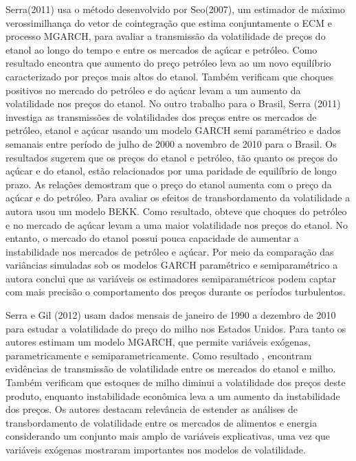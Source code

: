 \documentclass[a4paper,12pt] {article}
\begin{document}
	
	Serra(2011)  usa o método desenvolvido por Seo(2007), um estimador de máximo verossimilhança do vetor de cointegração que estima conjuntamente o ECM e 
	processo MGARCH, para avaliar a transmissão da volatilidade de preços do etanol ao longo do tempo e entre os mercados de açúcar e petróleo. Como resultado encontra que aumento do preço petróleo leva ao  um novo equilíbrio caracterizado por preços mais altos do etanol.  Também verificam que choques positivos no mercado do petróleo e do açúcar levam a um aumento da volatilidade nos preços do etanol.  No outro trabalho para o Brasil, Serra (2011) investiga as transmissões de volatilidades dos preços entre os mercados de petróleo, etanol e açúcar  usando um modelo GARCH semi paramétrico e dados semanais entre período de julho de 2000 a novembro de 2010 para o Brasil. Os resultados sugerem que os preços do etanol e petróleo, tão quanto os preços do açúcar e do etanol, estão relacionados por uma paridade de equilíbrio de longo prazo. As relações demostram que o preço do etanol aumenta com o preço da açúcar e do petróleo. Para avaliar os efeitos de transbordamento da volatilidade a autora usou um modelo BEKK. Como resultado, obteve que choques do petróleo e no mercado de açúcar levam a uma maior volatilidade nos preços do etanol. No entanto, o mercado do etanol possui pouca capacidade de aumentar a instabilidade nos mercados de petróleo e açúcar. Por meio da comparação  das variâncias simuladas sob os modelos  GARCH paramétrico e semiparamétrico a autora conclui que as variáveis ​os estimadores  semiparamétricos podem captar com mais precisão o comportamento dos preços durante os períodos turbulentos.
	
	Serra e Gil (2012) usam dados mensais de janeiro de 1990 a dezembro de 2010 para estudar a volatilidade do preço do milho nos Estados Unidos. Para tanto os autores estimam um modelo MGARCH, que permite variáveis exógenas,  parametricamente e semiparametricamente. Como resultado , encontram evidências de transmissão de volatilidade entre os mercados do etanol e milho. Também verificam que estoques de milho diminui a volatilidade dos preços deste produto, enquanto instabilidade econômica leva a um aumento da instabilidade dos preços. Os autores destacam relevância de estender as análises de transbordamento de volatilidade entre os mercados de alimentos e energia considerando um conjunto mais amplo de variáveis explicativas, uma vez que  variáveis exógenas mostraram importantes nos modelos de volatilidade.
	
\end{document}
